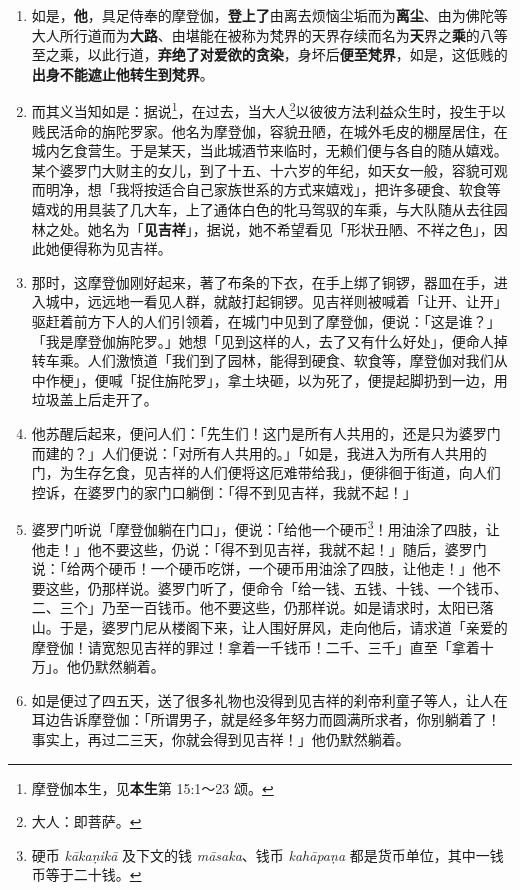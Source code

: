 \begin{enumerate}\item 如是，\textbf{他}，具足侍奉的摩登伽，\textbf{登上了}由离去烦恼尘垢而为\textbf{离尘}、由为佛陀等大人所行道而为\textbf{大路}、由堪能在被称为梵界的天界存续而名为\textbf{天}界之\textbf{乘}的八等至之乘，以此行道，\textbf{弃绝了对爱欲的贪染}，身坏后\textbf{便至梵界}，如是，这低贱的\textbf{出身不能遮止他转生到梵界}。
\item 而其义当知如是：据说\footnote{摩登伽本生，见\textbf{本生}第 15:1～23 颂。}，在过去，当大人\footnote{大人：即菩萨。}以彼彼方法利益众生时，投生于以贱民活命的旃陀罗家。他名为摩登伽，容貌丑陋，在城外毛皮的棚屋居住，在城内乞食营生。于是某天，当此城酒节来临时，无赖们便与各自的随从嬉戏。某个婆罗门大财主的女儿，到了十五、十六岁的年纪，如天女一般，容貌可观而明净，想「我将按适合自己家族世系的方式来嬉戏」，把许多硬食、软食等嬉戏的用具装了几大车，上了通体白色的牝马驾驭的车乘，与大队随从去往园林之处。她名为「\textbf{见吉祥}」，据说，她不希望看见「形状丑陋、不祥之色」，因此她便得称为见吉祥。
\item 那时，这摩登伽刚好起来，著了布条的下衣，在手上绑了铜锣，器皿在手，进入城中，远远地一看见人群，就敲打起铜锣。见吉祥则被喊着「让开、让开」驱赶着前方下人的人们引领着，在城门中见到了摩登伽，便说：「这是谁？」「我是摩登伽旃陀罗。」她想「见到这样的人，去了又有什么好处」，便命人掉转车乘。人们激愤道「我们到了园林，能得到硬食、软食等，摩登伽对我们从中作梗」，便喊「捉住旃陀罗」，拿土块砸，以为死了，便提起脚扔到一边，用垃圾盖上后走开了。
\item 他苏醒后起来，便问人们：「先生们！这门是所有人共用的，还是只为婆罗门而建的？」人们便说：「对所有人共用的。」「如是，我进入为所有人共用的门，为生存乞食，见吉祥的人们便将这厄难带给我」，便徘徊于街道，向人们控诉，在婆罗门的家门口躺倒：「得不到见吉祥，我就不起！」
\item 婆罗门听说「摩登伽躺在门口」，便说：「给他一个硬币\footnote{硬币 \textit{kākaṇikā} 及下文的钱 \textit{māsaka}、钱币 \textit{kahāpaṇa} 都是货币单位，其中一钱币等于二十钱。}！用油涂了四肢，让他走！」他不要这些，仍说：「得不到见吉祥，我就不起！」随后，婆罗门说：「给两个硬币！一个硬币吃饼，一个硬币用油涂了四肢，让他走！」他不要这些，仍那样说。婆罗门听了，便命令「给一钱、五钱、十钱、一个钱币、二、三个」乃至一百钱币。他不要这些，仍那样说。如是请求时，太阳已落山。于是，婆罗门尼从楼阁下来，让人围好屏风，走向他后，请求道「亲爱的摩登伽！请宽恕见吉祥的罪过！拿着一千钱币！二千、三千」直至「拿着十万」。他仍默然躺着。
\item 如是便过了四五天，送了很多礼物也没得到见吉祥的刹帝利童子等人，让人在耳边告诉摩登伽：「所谓男子，就是经多年努力而圆满所求者，你别躺着了！事实上，再过二三天，你就会得到见吉祥！」他仍默然躺着。

\end{enumerate}
